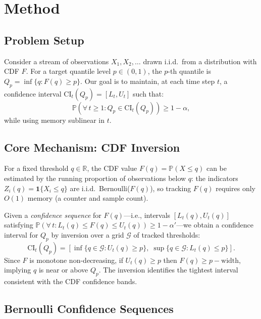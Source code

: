 \documentclass{article}
\newcommand{\Qp}{Q_p}
\newcommand{\CI}{\mathrm{CI}}
\newcommand{\R}{\mathbb{R}}
\renewcommand{\Pr}{\mathbb{P}}
\newcommand{\ind}{\mathbf{1}}
\begin{document}
\section{Method}
\label{sec:method}

\subsection{Problem Setup}

Consider a stream of observations $X_1, X_2, \ldots$ drawn i.i.d.\ from a distribution with CDF $F$. For a target quantile level $p \in (0,1)$, the $p$-th quantile is $\Qp = \inf\{q : F(q) \geq p\}$. Our goal is to maintain, at each time step $t$, a confidence interval $\CI_t(\Qp) = [L_t, U_t]$ such that:
\begin{equation}
    \Pr\!\left(\forall\, t \geq 1 : \Qp \in \CI_t(\Qp)\right) \geq 1 - \alpha,
    \label{eq:anytime_valid}
\end{equation}
while using memory sublinear in $t$.

\subsection{Core Mechanism: CDF Inversion}

For a fixed threshold $q \in \R$, the CDF value $F(q) = \Pr(X \leq q)$ can be estimated by the running proportion of observations below $q$: the indicators $Z_i(q) = \ind\{X_i \leq q\}$ are i.i.d.\ Bernoulli($F(q)$), so tracking $F(q)$ requires only $O(1)$ memory (a counter and sample count).

Given a \emph{confidence sequence} for $F(q)$---i.e., intervals $[L_t(q), U_t(q)]$ satisfying $\Pr(\forall\, t : L_t(q) \leq F(q) \leq U_t(q)) \geq 1 - \alpha'$---we obtain a confidence interval for $\Qp$ by inversion over a grid $\mathcal{G}$ of tracked thresholds:
\begin{equation}
    \CI_t(\Qp) = \left[\inf\{q \in \mathcal{G} : U_t(q) \geq p\},\; \sup\{q \in \mathcal{G} : L_t(q) \leq p\}\right].
    \label{eq:cdf_inversion}
\end{equation}
Since $F$ is monotone non-decreasing, if $U_t(q) \geq p$ then $F(q) \geq p - \text{width}$, implying $q$ is near or above $\Qp$. The inversion identifies the tightest interval consistent with the CDF confidence bands.

\subsection{Bernoulli Confidence Sequences}
\end{document}
